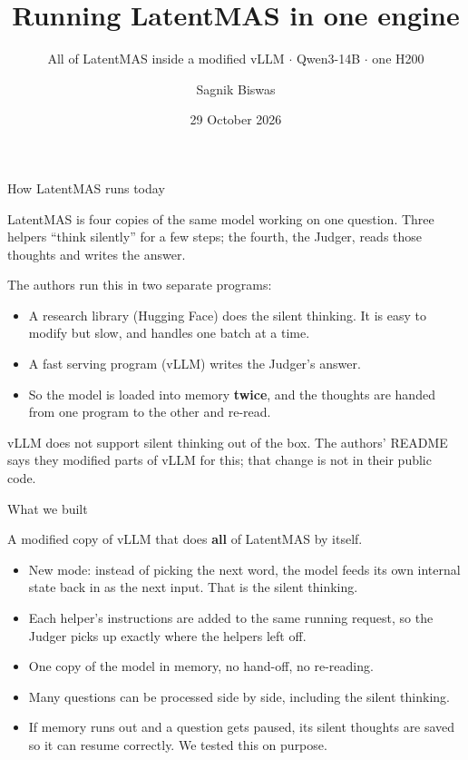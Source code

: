 \documentclass[aspectratio=169]{beamer}
\title{Running LatentMAS in one engine}
\subtitle{All of LatentMAS inside a modified vLLM $\cdot$ Qwen3-14B $\cdot$ one H200}
\author{Sagnik Biswas}
\date{29 October 2026}
\begin{document}
\begin{frame}
\titlepage
\end{frame}

\begin{frame}{How LatentMAS runs today}

LatentMAS is four copies of the same model working on one question.
Three helpers ``think silently'' for a few steps; the fourth, the Judger, reads those thoughts and writes the answer.

\vspace{0.5em}
The authors run this in two separate programs:
\begin{itemize}
  \item A research library (Hugging Face) does the silent thinking.
    It is easy to modify but slow, and handles one batch at a time.
  \item A fast serving program (vLLM) writes the Judger's answer.
  \item So the model is loaded into memory \textbf{twice}, and the thoughts
    are handed from one program to the other and re-read.
\end{itemize}

\vspace{0.5em}
vLLM does not support silent thinking out of the box. The authors' README says they modified
parts of vLLM for this; that change is not in their public code.

\end{frame}

\begin{frame}{What we built}

A modified copy of vLLM that does \textbf{all} of LatentMAS by itself.

\begin{itemize}
  \item New mode: instead of picking the next word, the model feeds its own
    internal state back in as the next input. That is the silent thinking.
  \item Each helper's instructions are added to the same running request,
    so the Judger picks up exactly where the helpers left off.
  \item One copy of the model in memory, no hand-off, no re-reading.
  \item Many questions can be processed side by side, including the silent thinking.
  \item If memory runs out and a question gets paused, its silent thoughts are
    saved so it can resume correctly. We tested this on purpose.
\end{itemize}

\end{frame}
\end{document}

